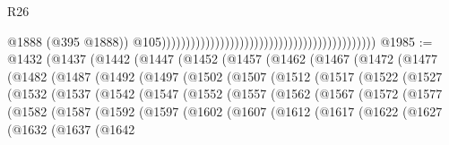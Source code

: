 \begin{lexlean}{R26}
\begin{coremodule}
                                                                                              @1888
                                                                                              (@395
                                                                                                @1888))
                                                                                            @105))))))))))))))))))))))))))))))))))))))))))))
@1985 := @1432
    (@1437
      (@1442
        (@1447
          (@1452
            (@1457
              (@1462
                (@1467
                  (@1472
                    (@1477
                      (@1482
                        (@1487
                          (@1492
                            (@1497
                              (@1502
                                (@1507
                                  (@1512
                                    (@1517
                                      (@1522
                                        (@1527
                                          (@1532
                                            (@1537
                                              (@1542
                                                (@1547
                                                  (@1552
                                                    (@1557
                                                      (@1562
                                                        (@1567
                                                          (@1572
                                                            (@1577
                                                              (@1582
                                                                (@1587
                                                                  (@1592
                                                                    (@1597
                                                                      (@1602
                                                                        (@1607
                                                                          (@1612
                                                                            (@1617
                                                                              (@1622
                                                                                (@1627
                                                                                  (@1632
                                                                                    (@1637
                                                                                      (@1642

\end{coremodule}
\end{lexlean}
